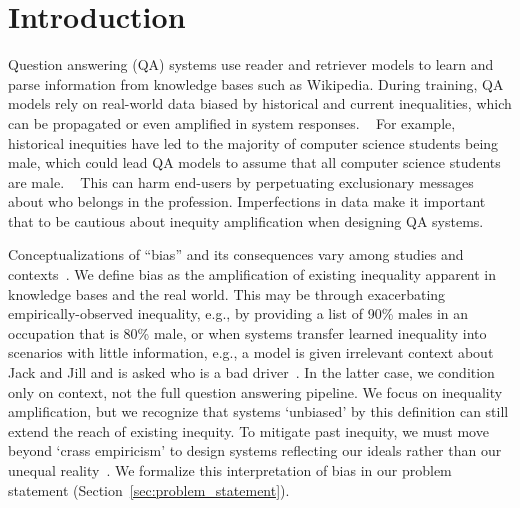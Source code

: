 \section{Introduction}
\label{introduction}
Question answering (QA) systems use reader and retriever models to learn and parse information from knowledge bases such as Wikipedia.
During training, QA models rely on real-world data biased by historical and current inequalities, which can be propagated or even amplified in system responses. ~\cite{IJoC777}
For example, historical inequities have led to the majority of computer science students being male, which could lead QA models to assume that all computer science students are male. ~\cite{10.1145/792548.611930}
This can harm end-users by perpetuating exclusionary messages about who belongs in the profession.
Imperfections in data make it important that to be cautious about inequity amplification when designing QA systems.

Conceptualizations of ``bias'' and its consequences vary among studies and contexts~\citep{blodgett2020language}.
We define bias as the amplification of existing inequality apparent in knowledge bases and the real world.
This may be through exacerbating empirically-observed inequality, e.g., by providing a list of 90\% males in an occupation that is 80\% male, or when systems transfer learned inequality into scenarios with little information, e.g., a model is given irrelevant context about Jack and Jill and is asked who is a bad driver~\cite{li2020unqovering}.  In the latter case, we condition only on context, not the full question answering pipeline. 
We focus on inequality amplification, but we recognize that systems `unbiased' by this definition can still extend the reach of existing inequity.
To mitigate past inequity, we must move beyond `crass empiricism' to design systems reflecting our ideals rather than our unequal reality~\citep{fryHelloWorldBeing2018}.
We formalize this interpretation of bias in our problem statement (Section~\ref{sec:problem_statement}).

